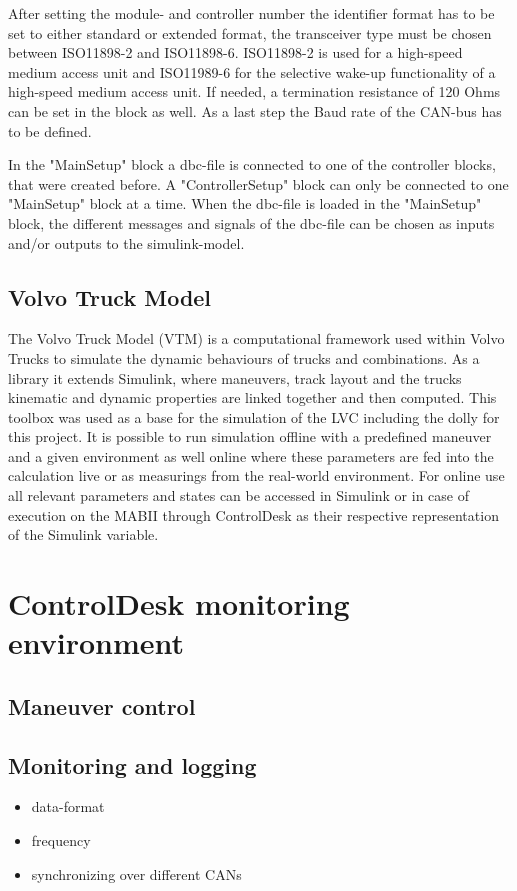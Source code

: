 \documentclass[ExampleMasters.tex]{subfiles}
\begin{document}
After setting the module- and controller number the identifier format has to be set to either standard or extended format, the transceiver type must be chosen between ISO11898-2 and ISO11898-6. ISO11898-2 is used for a high-speed medium access unit and ISO11989-6 for the selective wake-up functionality of a high-speed medium access unit. If needed, a termination resistance of 120 Ohms can be set in the block as well. As a last step the Baud rate of the CAN-bus has to be defined.


In the "MainSetup" block a dbc-file is connected to one of the controller blocks, that were created before. A "ControllerSetup" block can only be connected to one "MainSetup" block at a time. When the dbc-file is loaded in the "MainSetup" block, the different messages and signals of the dbc-file can be chosen as inputs and/or outputs to the simulink-model.
\subsection{Volvo Truck Model}
\label{sec:VTM}
The Volvo Truck Model (VTM) is a computational framework used within Volvo Trucks to simulate the dynamic behaviours of trucks and combinations. As a library it extends Simulink, where maneuvers, track layout and the trucks kinematic and dynamic properties are linked together and then computed. This toolbox was used as a base for the simulation of the LVC including the dolly for this project. It is possible to run simulation offline with a predefined maneuver and a given environment as well online where these parameters are fed into the calculation live or as measurings from the real-world environment. For online use all relevant parameters and states can be accessed in Simulink or in case of execution on the MABII through ControlDesk as their respective representation of the Simulink variable. 

\section{ControlDesk monitoring environment}
\label{sec:control_desk}
\subsection{Maneuver control}


\subsection{Monitoring and logging}
\begin{itemize}
	\item data-format
	\item frequency
	\item synchronizing over different CANs	
\end{itemize}
\end{document}
